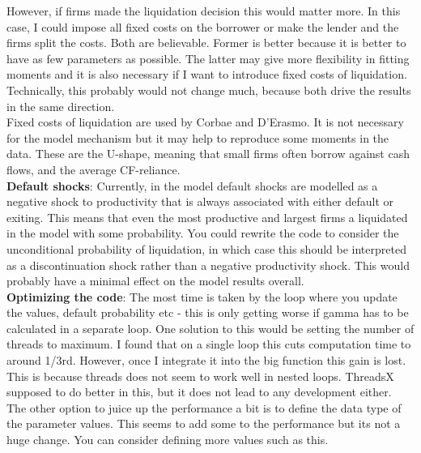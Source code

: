 \documentclass[12pt]{article}
\begin{document}
However, if firms made the liquidation decision this would matter more. In this case, I could impose all fixed costs on the borrower or make the lender and the firms split the costs. Both are believable. Former is better because it is better to have as few parameters as possible. The latter may give more flexibility in fitting moments and it is also necessary if I want to introduce fixed costs of liquidation. Technically, this probably would not change much, because both drive the results in the same direction. 
\vspace{3mm} \\
Fixed costs of liquidation are used by Corbae and D'Erasmo. It is not necessary for the model mechanism but it may help to reproduce some moments in the data. These are the U-shape, meaning that small firms often borrow against cash flows, and the average CF-reliance. \vspace{3mm} \\
\textbf{Default shocks}:
Currently, in the model default shocks are modelled as a negative shock to productivity that is always associated with either default or exiting. This means that even the most productive and largest firms a liquidated in the model with some probability. You could rewrite the code to consider the unconditional probability of liquidation, in which case this should be interpreted as a discontinuation shock rather than a negative productivity shock. This would probably have a minimal effect on the model results overall.  \vspace{3mm} \\
\textbf{Optimizing the code}:
The most time is taken by the loop where you update the values, default probability etc - this is only getting worse if gamma has to be calculated in a separate loop. One solution to this would be setting the number of threads to maximum. I found that on a single loop this cuts computation time to around 1/3rd. However, once I integrate it into the big function this gain is lost. This is because threads does not seem to work well in nested loops. ThreadsX supposed to do better in this, but it does not lead to any development either. \vspace{3mm} \\
The other option to juice up the performance a bit is to define the data type of the parameter values. This seems to add some to the performance but its not a huge change. You can consider defining more values such as this.
\end{document}
